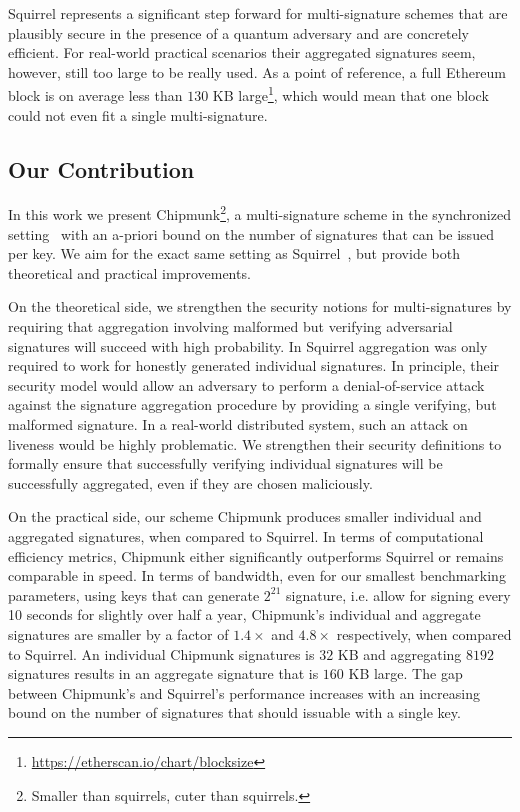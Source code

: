 Squirrel represents a significant step forward for multi-signature schemes that are plausibly secure in the presence of a quantum adversary and are concretely efficient.
For real-world practical scenarios their aggregated signatures seem, however, still too large to be really used.
As a point of reference, a full Ethereum block is on average less than $130$ KB large\footnote{\url{https://etherscan.io/chart/blocksize}}, which would mean that one block could not even fit a single multi-signature.

\subsection{Our Contribution}
In this work we present Chipmunk\footnote{Smaller than squirrels, cuter than squirrels.}, a multi-signature scheme in the synchronized setting~\cite{PKC:GenRam06,CCS:AhnGreHoh10,EC:HohWat18,USENIX:DGNW20} with an a-priori bound on the number of signatures that can be issued per key. 
We aim for the exact same setting as Squirrel~\cite{CCS:FleSimZha22}, but provide both theoretical and practical improvements.

On the theoretical side, we strengthen the security notions for multi-signatures by requiring that aggregation involving malformed but verifying adversarial signatures will succeed with high probability. 
In Squirrel aggregation was only required to work for honestly generated individual signatures. 
In principle, their security model would allow an adversary to perform a denial-of-service attack against the signature aggregation procedure by providing a single verifying, but malformed signature.
In a real-world distributed system, such an attack on liveness would be highly problematic.
We strengthen their security definitions to formally ensure that successfully verifying individual signatures will be successfully aggregated, even if they are chosen maliciously. 

On the practical side, our scheme Chipmunk produces smaller individual and aggregated signatures, when compared to Squirrel.
In terms of computational efficiency metrics, Chipmunk either significantly outperforms Squirrel or remains comparable in speed.
In terms of bandwidth, even for our smallest benchmarking parameters, using keys that can generate $2^{21}$ signature, i.e. allow for signing every 10 seconds for slightly over half a year, Chipmunk's individual and aggregate signatures are smaller by a factor of $1.4\times$ and $4.8\times$ respectively, when compared to Squirrel.
An individual Chipmunk signatures is $32$ KB and aggregating $8192$ signatures results in an aggregate signature that is $160$ KB large.
The gap between Chipmunk's and Squirrel's performance increases with an increasing bound on the number of signatures that should issuable with a single key.

